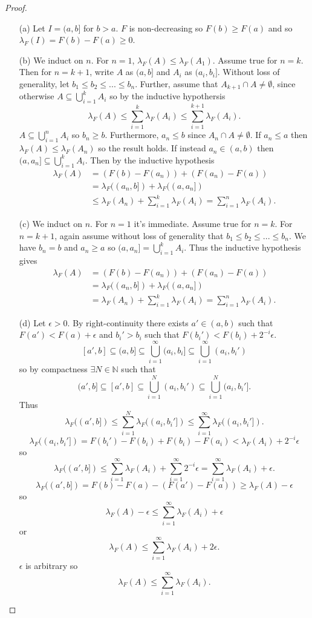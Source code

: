 \documentclass{article}
\begin{document}
\begin{proof}
\begin{enumerate}
    \item[(a)] Let $I=(a,b]$ for $b>a$. $F$ is non-decreasing so $F(b)\geq F(a)$ and so $\lambda_F(I)=F(b)-F(a)\geq0$.
    \item[(b)] We induct on $n$. For $n=1$, $\lambda_F(A)\leq\lambda_F(A_1)$. Assume true for $n=k$. Then for $n=k+1$, write $A$ as $(a,b]$ and $A_i$ as $(a_i,b_i]$. Without loss of generality, let $b_1\leq b_2\leq...\leq b_n$. Further, assume that $A_{k+1}\cap A\neq\emptyset$, since otherwise $A\subseteq\bigcup_{i=1}^k A_i$ so by the inductive hypothersis \[\lambda_F(A)\leq\sum_{i=1}^k\lambda_F(A_i)\leq\sum_{i=1}^{k+1}\lambda_F(A_i).\] $A\subseteq\bigcup_{i=1}^n A_i$ so $b_n\geq b$. Furthermore, $a_n\leq b$ since $A_n\cap A\neq\emptyset$. If $a_n\leq a$ then $\lambda_F(A)\leq\lambda_F(A_n)$ so the result holds. If instead $a_n\in(a,b)$ then $(a,a_n]\subseteq\bigcup_{i=1}^k A_i$. Then by the inductive hypothesis \begin{align*}\lambda_F(A)&=(F(b)-F(a_n))+(F(a_n)-F(a))\\&=\lambda_F((a_n,b])+\lambda_F((a,a_n])\\&\leq\lambda_F(A_n)+\sum_{i=1}^k\lambda_F(A_i)=\sum_{i=1}^n\lambda_F(A_i).\end{align*}
    \item[(c)] We induct on $n$. For $n=1$ it's immediate. Assume true for $n=k$. For $n=k+1$, again assume without loss of generality that $b_1\leq b_2\leq...\leq b_n$. We have $b_n=b$ and $a_n\geq a$ so $(a,a_n]=\bigcup_{i=1}^kA_i$. Thus the inductive hypothesis gives \begin{align*}\lambda_F(A)&=(F(b)-F(a_n))+(F(a_n)-F(a))\\&=\lambda_F((a_n,b])+\lambda_F((a,a_n])\\&=\lambda_F(A_n)+\sum_{i=1}^k\lambda_F(A_i)=\sum_{i=1}^n\lambda_F(A_i).\end{align*}
    \item[(d)] Let $\epsilon>0$. By right-continuity there exists $a'\in(a,b)$ such that $F(a')<F(a)+\epsilon$ and $b_i'>b_i$ such that $F(b_i')<F(b_i)+2^{-i}\epsilon$.
    \[[a',b]\subseteq(a,b]\subseteq\bigcup_{i=1}^\infty(a_i,b_i]\subseteq\bigcup_{i=1}^\infty(a_i,b_i')\] so by compactness $\exists N\in\mathbb{N}$ such that \[(a',b]\subseteq[a',b]\subseteq\bigcup_{i=1}^N(a_i,b_i')\subseteq\bigcup_{i=1}^N(a_i,b_i'].\] Thus \[\lambda_F((a',b])\leq\sum_{i=1}^N\lambda_F((a_i,b_i'])\leq\sum_{i=1}^\infty\lambda_F((a_i,b_i']).\] \[\lambda_F((a_i,b_i'])=F(b_i')-F(b_i)+F(b_i)-F(a_i)<\lambda_F(A_i)+2^{-i}\epsilon\] so \[\lambda_F((a',b])\leq\sum_{i=1}^\infty\lambda_F(A_i)+\sum_{i=1}^\infty2^{-i}\epsilon=\sum_{i=1}^\infty\lambda_F(A_i) + \epsilon.\] \[\lambda_F((a',b])=F(b)-F(a)-(F(a')-F(a))\geq\lambda_F(A)-\epsilon\] so \[\lambda_F(A)-\epsilon\leq\sum_{i=1}^\infty\lambda_F(A_i)+\epsilon\] or \[\lambda_F(A)\leq\sum_{i=1}^\infty\lambda_F(A_i) +2\epsilon.\] $\epsilon$ is arbitrary so \[\lambda_F(A)\leq\sum_{i=1}^\infty\lambda_F(A_i).\]
\end{enumerate}
\end{proof}
\end{document}
